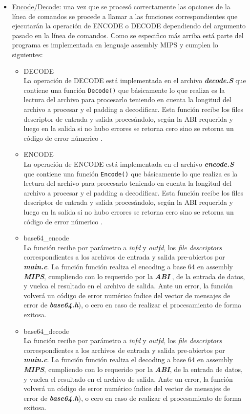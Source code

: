 \documentclass[11pt,a4paper]{article}
\begin{document}
\begin{itemize}
	\item \underline{Encode/Decode:} una vez que se procesó correctamente las opciones de la línea de comandos se procede a llamar a las funciones correspondientes que ejecutarán la operación de ENCODE o DECODE dependiendo del argumento pasado en la línea de comandos. Como se especifico más arriba está parte del programa es implementada en lenguaje assembly MIPS y cumplen lo siguientes:
\begin{itemize}
	\item{DECODE}\\
La operación de DECODE está implementada en el archivo \textit{\textbf{decode.S}} que contiene una función
\texttt{Decode()} que básicamente lo que realiza es la lectura del archivo para procesarlo teniendo en cuenta la longitud del archivo a procesar y el padding a decodificar. Esta función recibe los files descriptor de entrada y salida procesándolo, según la ABI requerida y luego en la salida si no hubo errores se retorna cero sino se retorna un código de error númerico .

	\item{ENCODE}\\
La operación de ENCODE está implementada en el archivo \textit{\textbf{encode.S}} que contiene una función
\texttt{Encode()} que básicamente lo que realiza es la lectura del archivo para procesarlo teniendo en cuenta la longitud del archivo a procesar y el padding a decodificar. Esta función recibe los files descriptor de entrada y salida procesándolo, según la ABI requerida y luego en la salida si no hubo errores se retorna cero sino se retorna un código de error númerico .
	
	\item{base64\_encode}\\
La función recibe por parámetro a \textit{infd} y \textit{outfd}, los \textit{file descriptors} correspondientes a los archivos de entrada y salida pre-abiertos por \textit{\textbf{main.c}}. La función función realiza el encoding a base 64 en assembly \textit{\textbf{MIPS}}, cumpliendo con lo requerido por  la \textit{\textbf{ABI}} , de la entrada de datos, y vuelca el resultado en el archivo de salida.
Ante un error, la función volverá un código de error numérico índice del vector de mensajes de error de \textit{\textbf{base64.h}}), o cero en caso de realizar el procesamiento de forma exitosa.

	\item{base64\_decode}\\	
La función recibe por parámetro a \textit{infd} y \textit{outfd}, los \textit{file descriptors} correspondientes a los archivos de entrada y salida pre-abiertos por \textit{\textbf{main.c}}. La función función realiza el decoding a base 64 en assembly \textit{\textbf{MIPS}}, cumpliendo con lo requerido por  la \textit{\textbf{ABI}}, de la entrada de datos, y vuelca el resultado en el archivo de salida.
Ante un error, la función volverá un código de error numérico índice del vector de mensajes de error de \textit{\textbf{base64.h}}), o cero en caso de realizar el procesamiento de forma exitosa.
	

\end{itemize}
\end{itemize}
\end{document}
